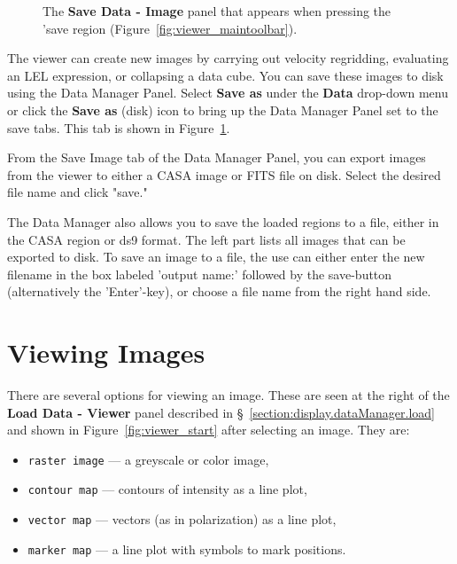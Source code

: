 \begin{figure}[h!]
\begin{center}
\caption{\label{fig:viewer_save} The {\bf Save Data - Image} panel
that appears when pressing the 'save region
(Figure~\ref{fig:viewer_maintoolbar}).} 
\hrulefill
\end{center}
\end{figure}

The viewer can create new images by carrying out velocity regridding, evaluating an LEL
expression, or collapsing a data cube. You can save these images to disk using the 
Data Manager Panel. Select {\bf Save as} under the {\bf Data} drop-down menu or
click the {\bf Save as} (disk) icon to bring up the Data Manager Panel set to the save tabs.
This tab is shown in Figure~\ref{fig:viewer_save}. 

From the Save Image tab of the Data Manager Panel, you can export images from the
viewer to either a CASA image or FITS file on disk. Select the desired file name and click
"save."

The Data Manager also allows you to save the loaded regions to a file, either in the CASA
region or ds9 format. The left part lists all images that can be exported to disk.  To save an
image to a file, the use can either enter the new filename in the box
labeled 'output name:' followed by the save-button (alternatively the
'Enter'-key), or choose a file name from the right hand side.

\section{Viewing Images}
\label{section:display.image}

There are several options for viewing an image.  These are seen
at the right of the {\bf Load Data - Viewer} panel 
described in \S~\ref{section:display.dataManager.load} and shown in 
Figure~\ref{fig:viewer_start} after selecting an image.  They are:
\begin{itemize}
   \item {\tt raster image} --- a greyscale or color image,
   \item {\tt contour map} --- contours of intensity as a line plot,
   \item {\tt vector map} --- vectors (as in polarization) as a line plot,
   \item {\tt marker map} --- a line plot with symbols to mark positions.
\end{itemize}

